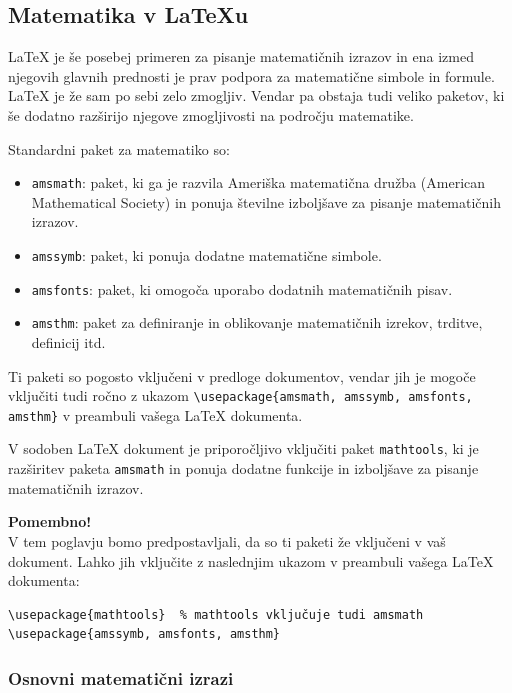 \subsection{Matematika v LaTeXu}

LaTeX je še posebej primeren za pisanje matematičnih izrazov in ena izmed njegovih glavnih prednosti je prav podpora za matematične simbole in formule.
LaTeX je že sam po sebi zelo zmogljiv. Vendar pa obstaja tudi veliko paketov, ki še dodatno razširijo njegove zmogljivosti na področju matematike.

Standardni paket za matematiko so:

\begin{itemize}
\item \texttt{amsmath}: paket, ki ga je razvila Ameriška matematična družba (American Mathematical Society) in ponuja številne izboljšave za pisanje matematičnih izrazov.
\item \texttt{amssymb}: paket, ki ponuja dodatne matematične simbole.
\item \texttt{amsfonts}: paket, ki omogoča uporabo dodatnih matematičnih pisav.
\item \texttt{amsthm}: paket za definiranje in oblikovanje matematičnih izrekov, trditve, definicij itd.
\end{itemize}

Ti paketi so pogosto vključeni v predloge dokumentov, vendar jih je mogoče vključiti tudi ročno z ukazom \texttt{{\textbackslash}usepackage\{amsmath, amssymb, amsfonts, amsthm\}} v preambuli vašega LaTeX dokumenta.

V sodoben LaTeX dokument je priporočljivo vključiti paket \texttt{mathtools}, ki je razširitev paketa \texttt{amsmath} in ponuja dodatne funkcije in izboljšave za pisanje matematičnih izrazov.

\begin{framed}
\textbf{Pomembno!}\\
V tem poglavju bomo predpostavljali, da so ti paketi že vključeni v vaš dokument. Lahko jih vključite z naslednjim ukazom v preambuli vašega LaTeX dokumenta:

\begin{verbatim}
\usepackage{mathtools}  % mathtools vključuje tudi amsmath
\usepackage{amssymb, amsfonts, amsthm}
\end{verbatim}
\end{framed}

\subsubsection{Osnovni matematični izrazi}

